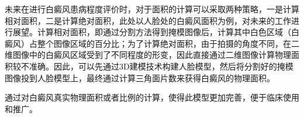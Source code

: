 未来在进行白癜风患病程度评价时，对于面积的计算可以采取两种策略，一是计算相对面积，二是计算绝对面积，此处以人脸处的白癜风面积为例，对未来的工作进行展望。计算相对面积，即通过分割方法得到掩模图像后，计算其中白色区域（白癜风）占整个图像区域的百分比；为了计算绝对面积，由于拍摄的角度不同，在二维图像中的白癜风区域受到了不同程度的形变，因此直接通过二维图像计算物理面积较不准确。因此，可以先通过3D建模技术构建人脸模型，然后将分割好的掩模图像投到人脸模型上，最终通过计算三角面片数来获得白癜风的物理面积。

通过对白癜风真实物理面积或者比例的计算，使得此模型更加完善，便于临床使用和推广。







